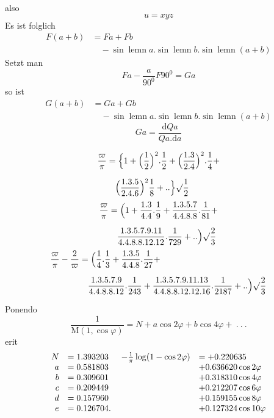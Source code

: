
also
\[
u=xyz
\]
Es ist folglich
\[
\begin{aligned}F(a+b)&=Fa+Fb\\[7pt]&\quad{}-\sin\operatorname{lemn}a.\sin\operatorname{lemn}b.\sin\operatorname{lemn}(a+b)\end{aligned}
\]
Setzt man
\[
Fa-\frac{a}{90^0}F90^0=Ga
\]
so ist
\[
\begin{aligned}G(a+b)&=Ga+Gb\\[7pt]&\quad{}-\sin\operatorname{lemn}a.\sin\operatorname{lemn}b.\sin\operatorname{lemn}(a+b)\end{aligned}
\]
\[
Ga=\frac{\mathrm dQa}{Qa.\mathrm da}
\]

\[
\begin{aligned}\frac{\varpi}{\pi}&=\Bigl\{1+\Bigl(\frac12\Bigr)^2.\frac12+
\Bigl(\frac{1.3}{2.4}\Bigr)^2.\frac14+
\\[7pt]&\quad{}\Bigl(\frac{1.3.5}{2.4.6}\Bigr)^2\frac18+..\Bigr\}\surd {\frac12}\end{aligned}
\]
\[
\begin{aligned}\frac{\varpi}{\pi}&=\Bigl(1+\frac{1.3}{4.4}.\frac19+
\frac{1.3.5.7}{4.4.8.8}.\frac1{81}+
\\[7pt]&\quad{}\frac{1.3.5.7.9.11}{4.4.8.8.12.12}.\frac1{729}+..\Bigr)\surd {\frac23}\end{aligned}
\]
\[
\begin{aligned}\frac{\varpi}{\pi}-\frac2{\varpi}&=\Bigl(\frac14.\frac13+\frac{1.3.5}{4.4.8}.\frac1{27}+
\\[7pt]&\quad{}\frac{1.3.5.7.9}{4.4.8.8.12}.\frac1{243}+
\frac{1.3.5.7.9.11.13}{4.4.8.8.12.12.16}.\frac1{2187}+..\Bigr)\surd {\frac23}\end{aligned}
\]

Ponendo
\[
\frac1{\mathrm M(1,\cos\varphi)}=N+a\cos2\varphi+b\cos4\varphi+\ .\ .\ .
\]
erit
\begingroup\small\[
\begin{array}{rl@{\hspace{12pt}}rl}
N&=1.393203&-\frac1\pi\log(1-\cos2\varphi)&=+0.220635\\
a&=0.581803&&+0.636620\cos2\varphi\\
b&=0.309601&&+0.318310\cos4\varphi\\
c&=0.209449&&+0.212207\cos6\varphi\\
d&=0.157960&&+0.159155\cos8\varphi\\
e&=0.126704.&&+0.127324\cos10\varphi
\end{array}
\]\endgroup

